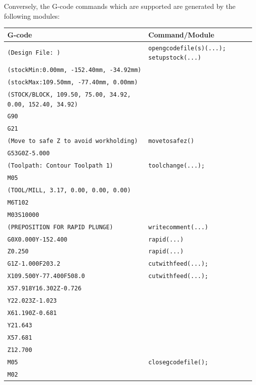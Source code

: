 \documentclass{ltxdoc}
\begin{document}
\noindent Conversely, the G-code commands which are supported are generated by the following modules:

\bigskip

\noindent \begin{tabular}{@{}ll@{}} \toprule
 G-code                                                           & Command/Module \\ \midrule
 \verb|(Design File: )| &  \texttt{opengcodefile(s)(...);}
                           \texttt{setupstock(...)}\\
 \verb|(stockMin:0.00mm, -152.40mm, -34.92mm)| \\
 \verb|(stockMax:109.50mm, -77.40mm, 0.00mm)| \\
 \verb|(STOCK/BLOCK, 109.50, 75.00, 34.92, 0.00, 152.40, 34.92)| \\
 \verb|G90| \\
 \verb|G21| \\ \midrule
 \verb|(Move to safe Z to avoid workholding)| &  \texttt{movetosafez()} \\
 \verb|G53G0Z-5.000| \\ \midrule
 \verb|(Toolpath: Contour Toolpath 1)| &  \texttt{toolchange(...);}\\
 \verb|M05| \\
 \verb|(TOOL/MILL, 3.17, 0.00, 0.00, 0.00)| \\
 \verb|M6T102| \\
 \verb|M03S10000|  \\ \midrule
 \verb|(PREPOSITION FOR RAPID PLUNGE)| & \texttt{writecomment(...)}\\ \midrule
 \verb|G0X0.000Y-152.400| & \texttt{rapid(...)}\\
 \verb|Z0.250| & \texttt{rapid(...)}\\ \midrule
 \verb|G1Z-1.000F203.2| & \texttt{cutwithfeed(...);}\\  
 \verb|X109.500Y-77.400F508.0| & \texttt{cutwithfeed(...);} \\ 
 \verb|X57.918Y16.302Z-0.726|\\ 
 \verb|Y22.023Z-1.023|\\ 
 \verb|X61.190Z-0.681|\\ 
 \verb|Y21.643|\\ 
 \verb|X57.681|\\
 \verb|Z12.700|\\ \midrule
 \verb|M05| &  \texttt{closegcodefile();}\\
 \verb|M02|\\
 \bottomrule
 \end{tabular}
\bigskip
\end{document}
